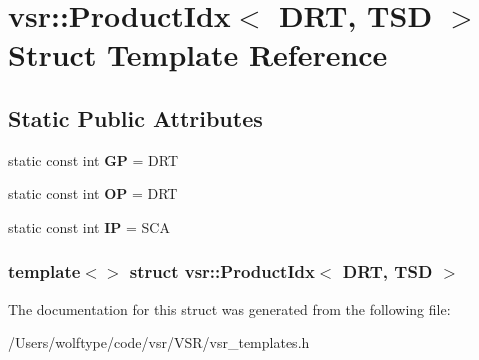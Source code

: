 \hypertarget{structvsr_1_1_product_idx_3_01_d_r_t_00_01_t_s_d_01_4}{\section{vsr\-:\-:Product\-Idx$<$ D\-R\-T, T\-S\-D $>$ Struct Template Reference}
\label{structvsr_1_1_product_idx_3_01_d_r_t_00_01_t_s_d_01_4}
}
\subsection*{Static Public Attributes}
\begin{DoxyCompactItemize}
\item 
\hypertarget{structvsr_1_1_product_idx_3_01_d_r_t_00_01_t_s_d_01_4_a6f04edc85788e002c8d51de360b5dd8c}{static const int {\bfseries G\-P} = D\-R\-T}\label{structvsr_1_1_product_idx_3_01_d_r_t_00_01_t_s_d_01_4_a6f04edc85788e002c8d51de360b5dd8c}

\item 
\hypertarget{structvsr_1_1_product_idx_3_01_d_r_t_00_01_t_s_d_01_4_a8a6d0746b4118094824fe3c42b96a194}{static const int {\bfseries O\-P} = D\-R\-T}\label{structvsr_1_1_product_idx_3_01_d_r_t_00_01_t_s_d_01_4_a8a6d0746b4118094824fe3c42b96a194}

\item 
\hypertarget{structvsr_1_1_product_idx_3_01_d_r_t_00_01_t_s_d_01_4_ae236e98aa110e150bfb70eba43f089ee}{static const int {\bfseries I\-P} = S\-C\-A}\label{structvsr_1_1_product_idx_3_01_d_r_t_00_01_t_s_d_01_4_ae236e98aa110e150bfb70eba43f089ee}

\end{DoxyCompactItemize}
\subsubsection*{template$<$$>$ struct vsr\-::\-Product\-Idx$<$ D\-R\-T, T\-S\-D $>$}



The documentation for this struct was generated from the following file\-:\begin{DoxyCompactItemize}
\item 
/\-Users/wolftype/code/vsr/\-V\-S\-R/vsr\-\_\-templates.\-h\end{DoxyCompactItemize}
